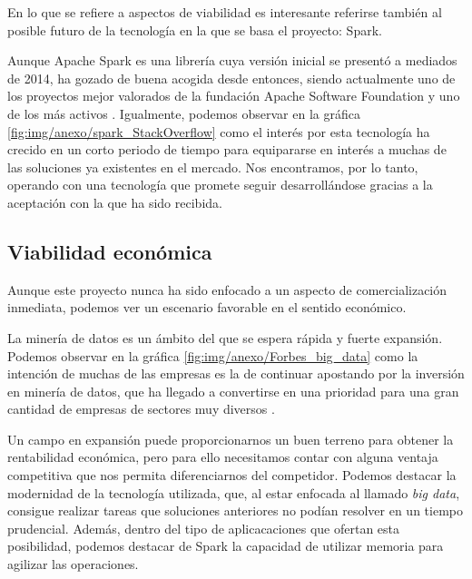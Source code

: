 En lo que se refiere a aspectos de viabilidad es interesante referirse también al posible futuro de la tecnología en la que se basa el proyecto: Spark.

Aunque Apache Spark es una librería cuya versión inicial se presentó a mediados de 2014, ha gozado de buena acogida desde entonces, siendo actualmente uno de los proyectos mejor valorados de la fundación Apache Software Foundation y uno de los más activos \cite{ApacheContributions}. Igualmente, podemos observar en la gráfica \ref{fig:img/anexo/spark_StackOverflow} como el interés por esta tecnología ha crecido en un corto periodo de tiempo para equipararse en interés a muchas de las soluciones ya existentes en el mercado. Nos encontramos, por lo tanto, operando con una tecnología que promete seguir desarrollándose gracias a la aceptación con la que ha sido recibida.



\subsection{Viabilidad económica}

Aunque este proyecto nunca ha sido enfocado a un aspecto de comercialización inmediata, podemos ver un escenario favorable en el sentido económico.

La minería de datos es un ámbito del que se espera rápida y fuerte expansión. Podemos observar en la gráfica \ref{fig:img/anexo/Forbes_big_data} como la intención de muchas de las empresas es la de continuar apostando por la inversión en minería de datos, que ha llegado a convertirse en una prioridad para una gran cantidad de empresas de sectores muy diversos \cite{forbesBigData}.


Un campo en expansión puede proporcionarnos un buen terreno para obtener la rentabilidad económica, pero para ello necesitamos contar con alguna ventaja competitiva que nos permita diferenciarnos del competidor. Podemos destacar la modernidad de la tecnología utilizada, que, al estar enfocada al llamado \textit{big data}, consigue realizar tareas que soluciones anteriores no podían resolver en un tiempo prudencial. Además, dentro del tipo de aplicacaciones que ofertan esta posibilidad, podemos destacar de Spark la capacidad de utilizar memoria para agilizar las operaciones.

